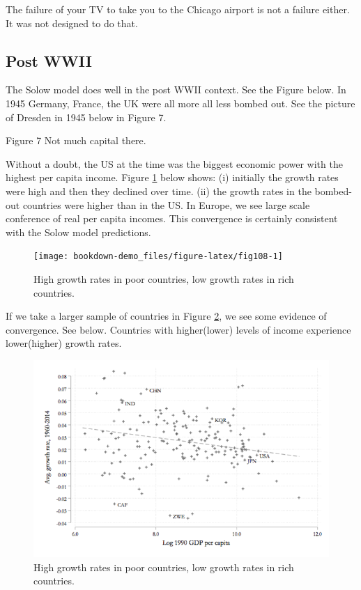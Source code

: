 \documentclass[
]{book}
\begin{document}
The failure of your TV to take you to the Chicago airport is not a failure either. It was not designed to do that.

\hypertarget{post-wwii}{%
\subsection{Post WWII}\label{post-wwii}}

The Solow model does well in the post WWII context. See the Figure below. In 1945 Germany, France, the UK were all more all less bombed out. See the picture of Dresden in 1945 below in Figure 7.

Figure 7 Not much capital there.

Without a doubt, the US at the time was the biggest economic power with the highest per capita income. Figure \ref{fig:fig108} below shows: (i) initially the growth rates were high and then they declined over time. (ii) the growth rates in the bombed-out countries were higher than in the US. In Europe, we see large scale conference of real per capita incomes. This convergence is certainly consistent with the Solow model predictions.

\begin{figure}
\texttt{[image: bookdown-demo\_files/figure-latex/fig108-1]} \caption{High growth rates in poor countries, low growth rates in rich countries.}\label{fig:fig108}
\end{figure}

If we take a larger sample of countries in Figure \ref{fig:fig109}, we see some evidence of convergence. See below. Countries with higher(lower) levels of income experience lower(higher) growth rates.

\begin{figure}
\includegraphics[width=1\linewidth]{img/ch1/growth9} \caption{High growth rates in poor countries, low growth rates in rich countries.}\label{fig:fig109}
\end{figure}
\end{document}

